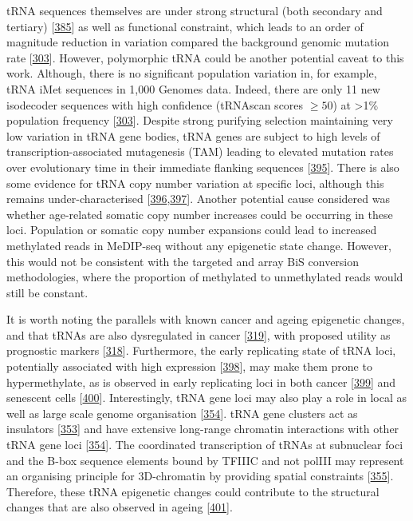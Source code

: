\documentclass[
]{book}
\begin{document}
tRNA sequences themselves are under strong structural (both secondary and tertiary) {[}\protect\hyperlink{ref-Goodenbour2006}{385}{]} as well as functional constraint, which leads to an order of magnitude reduction in variation compared the background genomic mutation rate {[}\protect\hyperlink{ref-Parisien2013}{303}{]}.
However, polymorphic tRNA could be another potential caveat to this work.
Although, there is no significant population variation in, for example, tRNA iMet sequences in 1,000 Genomes data.
Indeed, there are only 11 new isodecoder sequences with high confidence (tRNAscan scores \(\ge50\)) at \textgreater1\% population frequency {[}\protect\hyperlink{ref-Parisien2013}{303}{]}.
Despite strong purifying selection maintaining very low variation in tRNA gene bodies, tRNA genes are subject to high levels of transcription-associated mutagenesis (TAM) leading to elevated mutation rates over evolutionary time in their immediate flanking sequences {[}\protect\hyperlink{ref-Thornlow2018}{395}{]}.
There is also some evidence for tRNA copy number variation at specific loci, although this remains under-characterised {[}\protect\hyperlink{ref-Iben2015}{396},\protect\hyperlink{ref-Darrow2014}{397}{]}.
Another potential cause considered was whether age-related somatic copy number increases could be occurring in these loci.
Population or somatic copy number expansions could lead to increased methylated reads in MeDIP-seq without any epigenetic state change.
However, this would not be consistent with the targeted and array BiS conversion methodologies, where the proportion of methylated to unmethylated reads would still be constant.

It is worth noting the parallels with known cancer and ageing epigenetic changes, and that tRNAs are also dysregulated in cancer {[}\protect\hyperlink{ref-Huang2018}{319}{]}, with proposed utility as prognostic markers {[}\protect\hyperlink{ref-Krishnan2016}{318}{]}.
Furthermore, the early replicating state of tRNA loci, potentially associated with high expression {[}\protect\hyperlink{ref-Muller2017}{398}{]}, may make them prone to hypermethylate, as is observed in early replicating loci in both cancer {[}\protect\hyperlink{ref-Du2019}{399}{]} and senescent cells {[}\protect\hyperlink{ref-Cruickshanks2013}{400}{]}.
Interestingly, tRNA gene loci may also play a role in local as well as large scale genome organisation {[}\protect\hyperlink{ref-VanBortle2017}{354}{]}.
tRNA gene clusters act as insulators {[}\protect\hyperlink{ref-Raab2011}{353}{]} and have extensive long-range chromatin interactions with other tRNA gene loci {[}\protect\hyperlink{ref-VanBortle2017}{354}{]}.
The coordinated transcription of tRNAs at subnuclear foci and the B-box sequence elements bound by TFIIIC and not polIII may represent an organising principle for 3D-chromatin by providing spatial constraints {[}\protect\hyperlink{ref-Noma2006}{355}{]}.
Therefore, these tRNA epigenetic changes could contribute to the structural changes that are also observed in ageing {[}\protect\hyperlink{ref-Sun2018}{401}{]}.
\end{document}

